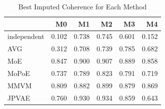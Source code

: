 \begin{table}
\caption{Best Imputed Coherence for Each Method}
\label{tab:best_imputed_coherence}
\begin{tabular}{lrrrrr}
\toprule
 & M0 & M1 & M2 & M3 & M4 \\
\midrule
independent & 0.102 & 0.738 & 0.745 & 0.601 & 0.152 \\
AVG & 0.312 & 0.708 & 0.739 & 0.785 & 0.682 \\
MoE & 0.847 & 0.900 & 0.907 & 0.889 & 0.858 \\
MoPoE & 0.737 & 0.789 & 0.823 & 0.791 & 0.719 \\
MMVM & 0.809 & 0.882 & 0.899 & 0.879 & 0.869 \\
JPVAE & 0.760 & 0.930 & 0.934 & 0.859 & 0.643 \\
\bottomrule
\end{tabular}
\end{table}

